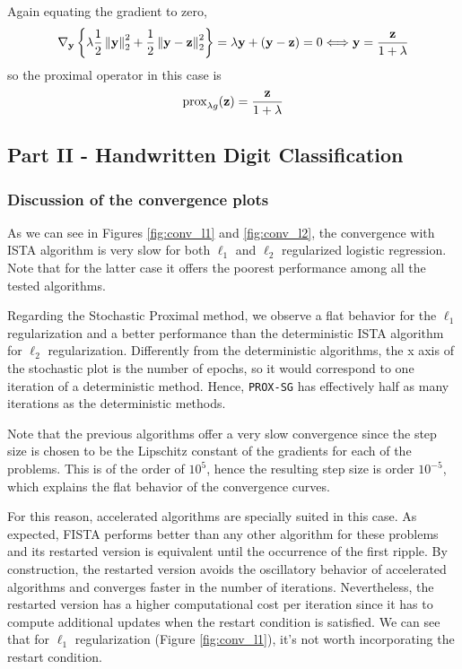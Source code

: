 \documentclass{article}
\begin{document}
\begin{enumerate}[label=1.I.\arabic*]
    Again equating the gradient to zero,
    \begin{align}
        \nabla_{\mathbf{y}} \left\lbrace \lambda \frac{1}{2}\left\lVert\mathbf{y}\right\rVert_2^2 + \frac{1}{2} \left\lVert\mathbf{y} - \mathbf{z}\right\rVert^2_2\right\rbrace = \lambda \mathbf{y} + (\mathbf{y} - \mathbf{z}) = 0 \Longleftrightarrow \mathbf{y} = \frac{\mathbf{z}}{1+\lambda}
    \end{align}
    so the proximal operator in this case is
    \begin{align}
        \text{prox}_{\lambda g}(\mathbf{z}) = \frac{\mathbf{z}}{1+\lambda}
    \end{align}
\end{enumerate}

\subsection*{Part II - Handwritten Digit Classification}

\subsubsection*{Discussion of the convergence plots}
As we can see in Figures \ref{fig:conv_l1} and \ref{fig:conv_l2}, the convergence with ISTA algorithm is very slow for both $\ell_1$ and $\ell_2$ regularized logistic regression. Note that for the latter case it offers the poorest performance among all the tested algorithms.

Regarding the Stochastic Proximal method, we observe a flat behavior for the $\ell_1$ regularization and a better performance than the deterministic ISTA algorithm for $\ell_2$ regularization. Differently from the deterministic algorithms, the x axis of the stochastic plot is the number of epochs, so it would correspond to one iteration of a deterministic method. Hence, \texttt{PROX-SG} has effectively half as many iterations as the deterministic methods.

Note that the previous algorithms offer a very slow convergence since the step size is chosen to be the Lipschitz constant of the gradients for each of the problems. This is of the order of $10^5$, hence the resulting step size is order $10^{-5}$, which explains the flat behavior of the convergence curves.

For this reason, accelerated algorithms are specially suited in this case. As expected, FISTA performs better than any other algorithm for these problems and its restarted version is equivalent until the occurrence of the first ripple. By construction, the restarted version avoids the oscillatory behavior of accelerated algorithms and converges faster in the number of iterations. Nevertheless, the restarted version has a higher computational cost per iteration since it has to compute additional updates when the restart condition is satisfied. We can see that for $\ell_1$ regularization (Figure \ref{fig:conv_l1}), it's not worth incorporating the restart condition.
\end{document}

